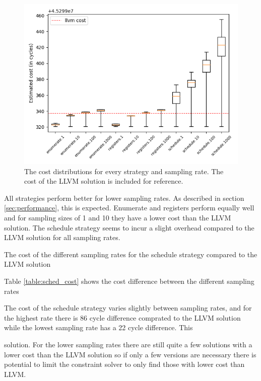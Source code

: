 \begin{figure}[h]
	\centering
	\includegraphics[width=\textwidth,height=0.5\textheight]{results/figures/cost}
	\caption{The cost distributions for every strategy and sampling rate. The cost of the LLVM solution is included for reference.}
	\label{fig:cost}
\end{figure}

All strategies perform better for lower sampling rates. As described in section
\ref{sec:performance}, this is expected. Enumerate and registers perform equally well and
for sampling sizes of 1 and 10 they have a lower cost than the LLVM solution. The schedule
strategy seems to incur a slight overhead compared to the LLVM solution for all sampling
rates.

\begin{table}[h]
	\centering
	
	\caption{The cost of the different sampling rates for the schedule strategy compared to the LLVM solution}
	\label{table:sched_cost}
\end{table}

Table \ref{table:sched_cost} shows the cost difference between the different
sampling rates 

The cost of the schedule strategy varies slightly between sampling rates, and for the
highest rate there is 86 cycle difference comprated to the LLVM solution while the lowest
sampling rate has a 22 cycle difference. This

solution. For the lower sampling rates there are still quite a few solutions with a lower
cost than the LLVM solution so if only a few versions are necessary there is potential to
limit the constraint solver to only find those with lower cost than LLVM.

